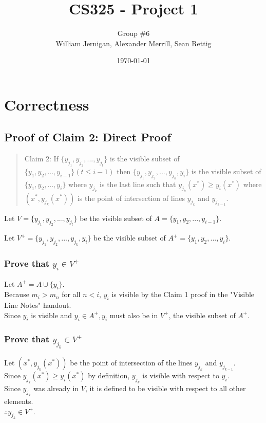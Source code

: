 \documentclass{article}
\title{CS325 - Project 1}
\author{Group \#6 \\ William Jernigan, Alexander Merrill, Sean Rettig}
\date{\today}
\begin{document}
\maketitle

\section*{Correctness}
\subsection*{Proof of Claim 2: Direct Proof}

\begin{quote}
Claim 2: If $\{y_{j_1}, y_{j_2},...,y_{j_{t}}\}$ is the visible subset of $\{y_1, y_2,...,y_{i - 1}\} (t \leq i - 1)$ then $\{y_{j_1}, y_{j_2},...,y_{j_{k}}, y_i\}$ is the visible subset of $\{y_1, y_2,...,y_{i}\}$ where $y_{j_{k}}$ is the last line such that $y_{j_{k}} (x^*) \geq y_i (x^*)$ where $(x^*, y_{j_{k}}(x^*))$ is the point of intersection of lines $y_{j_{k}}$ and $y_{j_{k - 1}}$.
\end{quote}

Let $V=\{y_{j_1}, y_{j_2},...,y_{j_{t}}\}$ be the visible subset of $A=\{y_1, y_2,...,y_{i - 1}\}$.

Let $V^+=\{y_{j_1}, y_{j_2},...,y_{j_{k}}, y_i\}$ be the visible subset of $A^+=\{y_1, y_2,...,y_{i}\}$.

\subsubsection*{Prove that $y_{i} \in V^+$}
Let $A^+ = A \cup \{y_i\}$.\\
Because $m_i > m_n$ for all $n < i$, $y_i$ is visible by the Claim 1 proof in the "Visible Line Notes" handout.\\
Since $y_i$ is visible and $y_i \in A^+, y_i$ must also be in $V^+$, the visible subset of $A^+$.

\subsubsection*{Prove that $y_{j_k} \in V^+$}
Let $(x^*, y_{j_k} (x^*))$ be the point of intersection of the lines $y_{j_k}$ and $y_{j_{k-1}}$.\\
Since $y_{j_k} (x^*) \geq y_i (x^*)$ by definition, $y_{j_k}$ is visible with respect to $y_i$.\\
Since $y_{j_k}$ was already in $V$, it is defined to be visible with respect to all other elements.\\
$\therefore y_{j_k} \in V^+$.
\end{document}
